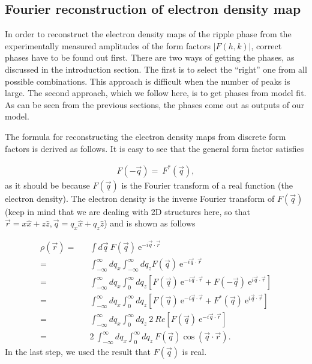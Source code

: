 \subsection{Fourier reconstruction of electron density map}

In order to reconstruct the electron density maps of the ripple phase
from the experimentally measured amplitudes of the form factors $|F(h,k)|$, 
correct phases have to be found out first. There are two ways of getting 
the phases, as discussed in the introduction section. The first is to
select the ``right'' one from all possible combinations. This approach
is difficult when the number of peaks is large. The second approach,
which we follow here, is to get phases from model fit. As can be seen
from the previous sections, the phases come out as outputs of our model.

The formula for reconstructing the electron density maps
from discrete form factors is derived as follows. It is easy to see that 
the general form factor satisfies 

\begin{eqnarray}
\label{formallcon2}
F(-\vec{q}) = \ F^{*}(\vec{q}),
\end{eqnarray}
as it should be because $F(\vec{q})$ is the Fourier transform of a real
function (the electron density).
The electron density is the inverse Fourier transform of $F(\vec{q})$
(keep in mind that we are dealing with 2D structures here, so that
\( \vec{r} = x \hat{x} + z \hat{z}, \vec{q} = q_x \hat{x} + q_z \hat{z}\))
and is shown as follows

\begin{eqnarray}
\label{edrecon}
\rho(\vec{r}) =&& \int d \vec{q}\ F(\vec{q})\ 
\mbox{e}^{- i \vec{q} \cdot \vec{r}}\nonumber\\
=&& \int_{- \infty}^{\infty} dq_x \int_{- \infty}^{\infty} dq_z
F(\vec{q})\ \mbox{e}^{- i \vec{q} \cdot \vec{r}}\nonumber\\
=&& \int_{- \infty}^{\infty} dq_x \int_{0}^{\infty} dq_z
\left[ F(\vec{q})\ \mbox{e}^{- i \vec{q} \cdot \vec{r}} +
F(-\vec{q})\ \mbox{e}^{i \vec{q} \cdot \vec{r}}\right]\nonumber\\
=&& \int_{- \infty}^{\infty} dq_x \int_{0}^{\infty} dq_z
\left[ F(\vec{q})\ \mbox{e}^{- i \vec{q} \cdot \vec{r}} +
F^{*}(\vec{q})\ \mbox{e}^{i \vec{q} \cdot \vec{r}}\right]\nonumber\\
=&& \int_{- \infty}^{\infty} dq_x \int_{0}^{\infty} dq_z
\ 2\ Re \left[ F(\vec{q})\ \mbox{e}^{- i \vec{q} \cdot \vec{r}}\right]\nonumber\\
=&& 2\ \int_{- \infty}^{\infty} dq_x \int_{0}^{\infty} dq_z
\ F(\vec{q}) \cos( \vec{q} \cdot \vec{r}).
\end{eqnarray}
In the last step, we used the result that $F(\vec{q})$ is real.

